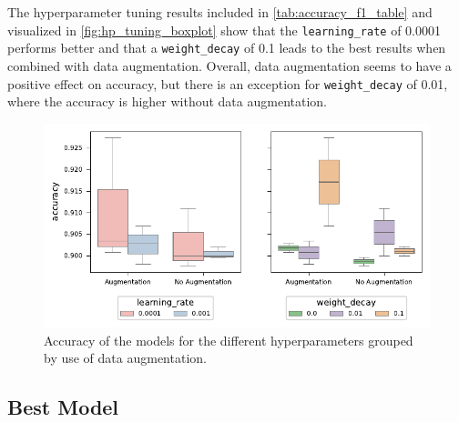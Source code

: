 The hyperparameter tuning results included in \autoref{tab:accuracy_f1_table} and
visualized in \autoref{fig:hp_tuning_boxplot} show that the \texttt{learning\_rate} of 0.0001
performs better and that a \texttt{weight\_decay} of 0.1 leads to the best results when
combined with data augmentation. Overall, data augmentation seems to have a positive
effect on accuracy, but there is an exception for \texttt{weight\_decay} of 0.01,
where the accuracy is higher without data augmentation.

\begin{figure}[H]
    \centering
    \captionsetup{width=0.8\linewidth}
    \includegraphics{figures/hp_tuning_boxplot.pdf}
    \caption{Accuracy of the models for the different hyperparameters grouped by use of data augmentation.}
    \label{fig:hp_tuning_boxplot}
\end{figure}

\subsection{Best Model}%

